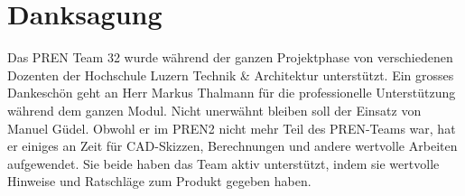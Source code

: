 \section{Danksagung}
Das PREN Team 32 wurde während der ganzen Projektphase von 
verschiedenen Dozenten der Hochschule Luzern Technik \& Architektur unterstützt. 
Ein grosses Dankeschön geht an Herr Markus Thalmann für die professionelle Unterstützung während dem
ganzen Modul.\newline
Nicht unerwähnt bleiben soll der Einsatz von Manuel Güdel. Obwohl er im PREN2 nicht mehr Teil des
PREN-Teams war, hat er einiges an Zeit für CAD-Skizzen, Berechnungen und andere wertvolle Arbeiten aufgewendet.
Sie beide haben das Team aktiv unterstützt, indem sie wertvolle Hinweise und Ratschläge zum Produkt gegeben haben.
